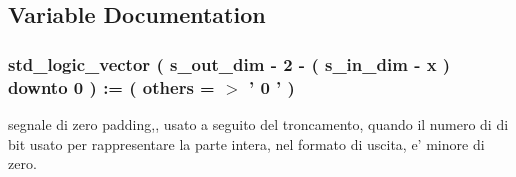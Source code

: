 \subsection{Variable Documentation}
\hypertarget{group___truncate_ga130836df2917c4b75d1fc24500082e76}{
\subsubsection[{padding\+\_\+neg}]{ {\bfseries \textcolor{vhdlchar}{std\+\_\+logic\+\_\+vector}\textcolor{vhdlchar}{ }\textcolor{vhdlchar}{(}\textcolor{vhdlchar}{ }\textcolor{vhdlchar}{ }\textcolor{vhdlchar}{ }\textcolor{vhdlchar}{ }{\bfseries {\bf s\+\_\+out\+\_\+dim}} \textcolor{vhdlchar}{-\/}\textcolor{vhdlchar}{ } \textcolor{vhdldigit}{2} \textcolor{vhdlchar}{-\/}\textcolor{vhdlchar}{ }\textcolor{vhdlchar}{(}\textcolor{vhdlchar}{ }\textcolor{vhdlchar}{ }\textcolor{vhdlchar}{ }\textcolor{vhdlchar}{ }{\bfseries {\bf s\+\_\+in\+\_\+dim}} \textcolor{vhdlchar}{-\/}\textcolor{vhdlchar}{ }\textcolor{vhdlchar}{ }\textcolor{vhdlchar}{ }{\bfseries {\bf x}} \textcolor{vhdlchar}{ }\textcolor{vhdlchar}{)}\textcolor{vhdlchar}{ }\textcolor{vhdlchar}{ }\textcolor{vhdlchar}{downto}\textcolor{vhdlchar}{ }\textcolor{vhdlchar}{ } \textcolor{vhdldigit}{0} \textcolor{vhdlchar}{ }\textcolor{vhdlchar}{)}\textcolor{vhdlchar}{ }\textcolor{vhdlchar}{ }\textcolor{vhdlchar}{ }\textcolor{vhdlchar}{\+:}\textcolor{vhdlchar}{=}\textcolor{vhdlchar}{ }\textcolor{vhdlchar}{(}\textcolor{vhdlchar}{ }\textcolor{vhdlchar}{ }\textcolor{vhdlchar}{others}\textcolor{vhdlchar}{ }\textcolor{vhdlchar}{ }\textcolor{vhdlchar}{=}\textcolor{vhdlchar}{ }\textcolor{vhdlchar}{$>$}\textcolor{vhdlchar}{ }\textcolor{vhdlchar}{'}\textcolor{vhdlchar}{ } \textcolor{vhdldigit}{0} \textcolor{vhdlchar}{ }\textcolor{vhdlchar}{'}\textcolor{vhdlchar}{ }\textcolor{vhdlchar}{)}\textcolor{vhdlchar}{ }} \hspace{0.3cm}{\ttfamily [Signal]}}}\label{group___truncate_ga130836df2917c4b75d1fc24500082e76}


segnale di zero padding,, usato a seguito del troncamento, quando il numero di di bit usato per rappresentare la parte intera, nel formato di uscita, e' minore di zero. 

